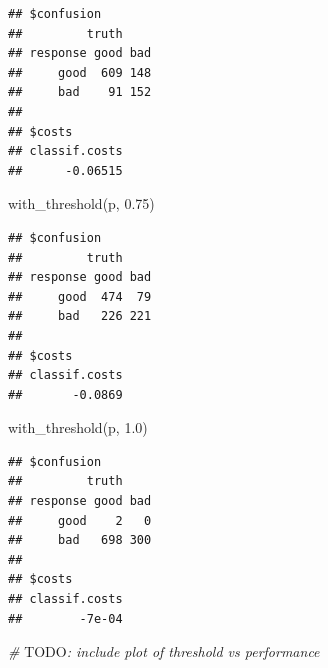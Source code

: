 \documentclass[
]{scrbook}
\newenvironment{Shaded}{\begin{snugshade}}{\end{snugshade}}
\newcommand{\AlertTok}[1]{\textcolor[rgb]{0.94,0.16,0.16}{#1}}
\newcommand{\AttributeTok}[1]{\textcolor[rgb]{0.77,0.63,0.00}{#1}}
\newcommand{\CommentTok}[1]{\textcolor[rgb]{0.56,0.35,0.01}{\textit{#1}}}
\newcommand{\ControlFlowTok}[1]{\textcolor[rgb]{0.13,0.29,0.53}{\textbf{#1}}}
\newcommand{\FloatTok}[1]{\textcolor[rgb]{0.00,0.00,0.81}{#1}}
\newcommand{\FunctionTok}[1]{\textcolor[rgb]{0.00,0.00,0.00}{#1}}
\newcommand{\NormalTok}[1]{#1}
\newcommand{\OtherTok}[1]{\textcolor[rgb]{0.56,0.35,0.01}{#1}}
\newcommand{\SpecialCharTok}[1]{\textcolor[rgb]{0.00,0.00,0.00}{#1}}
\renewenvironment{Shaded} {\begin{snugshade}\small} {\end{snugshade}}
\begin{document}
\begin{Shaded}
\end{Shaded}

\begin{verbatim}
## $confusion
##         truth
## response good bad
##     good  609 148
##     bad    91 152
## 
## $costs
## classif.costs 
##      -0.06515
\end{verbatim}

\begin{Shaded}
\begin{Highlighting}[]
\FunctionTok{with\_threshold}\NormalTok{(p, }\FloatTok{0.75}\NormalTok{)}
\end{Highlighting}
\end{Shaded}

\begin{verbatim}
## $confusion
##         truth
## response good bad
##     good  474  79
##     bad   226 221
## 
## $costs
## classif.costs 
##       -0.0869
\end{verbatim}

\begin{Shaded}
\begin{Highlighting}[]
\FunctionTok{with\_threshold}\NormalTok{(p, }\FloatTok{1.0}\NormalTok{)}
\end{Highlighting}
\end{Shaded}

\begin{verbatim}
## $confusion
##         truth
## response good bad
##     good    2   0
##     bad   698 300
## 
## $costs
## classif.costs 
##        -7e-04
\end{verbatim}

\begin{Shaded}
\begin{Highlighting}[]
\CommentTok{\# }\AlertTok{TODO}\CommentTok{: include plot of threshold vs performance}
\end{Highlighting}
\end{Shaded}
\end{document}
